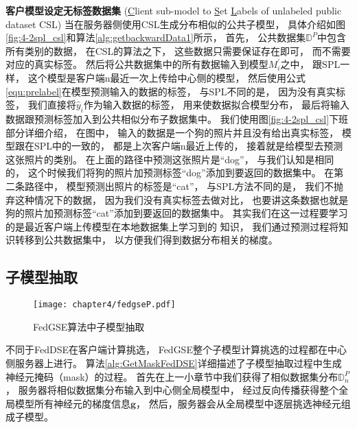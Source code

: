 \textbf{客户模型设定无标签数据集}
(\underline{C}lient sub-model to \underline{S}et 
\underline{L}abels of unlabeled public dataset CSL) 
当在服务器侧使用CSL生成分布相似的公共子模型，
具体介绍如图\ref{fig:4-2spl_csl}和算法\ref{alg:getbackwardData1}所示，
首先，
公共数据集$\mathbb{D}^P$中包含所有类别的数据，
在CSL的算法之下，
这些数据只需要保证存在即可，
而不需要对应的真实标签。
然后将公共数据集中的所有数据输入到模型$M_i^{'}$之中，
跟SPL一样，
这个模型是客户端n最近一次上传给中心侧的模型，
然后使用公式\ref{equ:prelabel}在模型预测输入的数据的标签，
与SPL不同的是，
因为没有真实标签，
我们直接将$\hat{y}_i$作为输入数据的标签，
用来使数据拟合模型分布，
最后将输入数据跟预测标签加入到公共相似分布子数据集中。
我们使用图\ref{fig:4-2spl_csl}下班部分详细介绍，
在图中，
输入的数据是一个狗的照片并且没有给出真实标签，
模型跟在SPL中的一致的，
都是上次客户端n最近上传的，
接着就是给模型去预测这张照片的类别。
在上面的路径中预测这张照片是“dog”，
与我们认知是相同的，
这个时候我们将狗的照片加预测标签“dog”添加到要返回的数据集中。
在第二条路径中，
模型预测出照片的标签是“cat”，
与SPL方法不同的是，
我们不抛弃这种情况下的数据，
因为我们没有真实标签去做对比，
也要讲这条数据也就是狗的照片加预测标签“cat”添加到要返回的数据集中。
其实我们在这一过程要学习的是最近客户端上传模型在本地数据集上学习到的
知识，
我们通过预测过程将知识转移到公共数据集中，
以方便我们得到数据分布相关的梯度。

\subsection{子模型抽取}
\begin{figure}[thbp]
    \centering
    \texttt{[image: chapter4/fedgseP.pdf]}
    \caption{\label{fig:4-2overview}FedGSE算法中子模型抽取}
\end{figure}
不同于FedDSE在客户端计算挑选，
FedGSE整个子模型计算挑选的过程都在中心侧服务器上进行。
算法\ref{alg:GetMaskFedDSE}详细描述了子模型抽取过程中生成
神经元掩码（mask）的过程。
首先在上一小章节中我们获得了相似数据集分布$\mathbb{D}_n^P$，
服务器将相似数据集分布输入到中心侧全局模型中，
经过反向传播获得整个全局模型所有神经元的梯度信息$\mathbf{g}$，
然后，服务器会从全局模型中逐层挑选神经元组成子模型。

